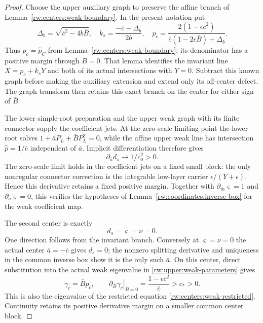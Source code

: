 \begin{proof}
Choose the upper auxiliary graph to preserve the affine branch of
Lemma~\ref{rw:centers:weak-boundary}. In the present notation put
\begin{equation}\label{rw:coordinates:weak-center-branch}
 \Delta_b=\sqrt{\bar c^2-4b\bar B},\quad
 k_s=\frac{-\bar c-\Delta_b}{2b},\quad
 p_c=\frac{2(1-\epsilon\bar c^2)}
              {\bar c(1-2\epsilon\bar B)+\Delta_b}.
\end{equation}
Thus $p_c=\widehat p_C$ from
Lemma~\ref{rw:centers:weak-boundary}; its denominator has a positive
margin through $\bar B=0$. That lemma identifies the invariant line
$X=p_c+k_sY$ and both of its actual intersections with $Y=0$.
Subtract this known graph before making the auxiliary extension and
extend only its off-center defect. The graph transform then retains
this exact branch on the center for either sign of $\bar B$.

The lower simple-root preparation and the upper weak graph with its
finite connector supply the coefficient jets. At the zero-scale limiting
point the lower root solves $1+\bar aP_L+\bar BP_L^2=0$, while
the affine upper weak line has intersection $\widehat p=1/\bar c$
independent of $\bar a$. Implicit differentiation therefore gives
\begin{equation}\label{rw:coordinates:weak-jacobian}
 \partial_{\bar a}d_s\longrightarrow1/\bar c_0^2>0.
\end{equation}
The zero-scale limit holds in the coefficient jets on a fixed small
block: the only nonregular connector correction is the integrable
low-layer carrier $\epsilon/(Y+\epsilon)$. Hence this derivative
retains a fixed positive margin. Together with
$\partial_{\bar m}\varsigma=1$ and $\partial_{\bar a}\varsigma=0$,
this verifies the hypotheses of
Lemma~\ref{rw:coordinates:inverse-box} for the weak coefficient map.

The second center is exactly
\begin{equation}\label{rw:coordinates:weak-center-axis}
 d_s=\varsigma=\nu=0.
\end{equation}
One direction follows from the invariant branch. Conversely at
$\varsigma=\nu=0$ the actual center $\bar a=-\bar c$ gives
$d_s=0$; the nonzero splitting derivative and uniqueness in the
common inverse box show it is the only such $\bar a$.
On this center, direct substitution into the actual weak eigenvalue
in \eqref{rw:upper:weak-parameters} gives
\begin{equation}\label{rw:coordinates:gamma-center}
 \gamma_c=\bar Bp_c,\qquad
 \left.\partial_{\bar B}\gamma_c\right|_{\bar B=0}
   =\frac{1-\epsilon\bar c^2}{\bar c}>c_*>0.
\end{equation}
This is also the eigenvalue of the restricted equation
\eqref{rw:centers:weak-restricted}. Continuity retains its positive
derivative margin on a smaller common center block.


\end{proof}
